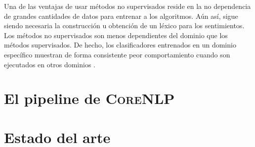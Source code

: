 Una de las ventajas de usar métodos no supervisados reside en la no dependencia
de grandes cantidades de datos para entrenar a los algoritmos. Aún así, sigue
siendo necesaria la construcción u obtención de un léxico para los
sentimientos. Los métodos no supervisados son menos dependientes del dominio que
los métodos supervisados. De hecho, los clasificadores entrenados en un dominio
específico muestran de forma consistente peor comportamiento cuando son
ejecutados en otros dominios \cite{anthony2005}.


\section{El pipeline de \textsc{CoreNLP}}
\label{sec:corenlppipeline}

\section{Estado del arte}
\label{sec:stateoftheart}



